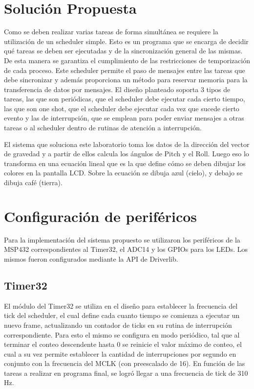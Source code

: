 \section{Solución Propuesta}

Como se deben realizar varias tareas de forma simultánea se requiere la
utilización de un scheduler simple. Esto es un programa que se encarga de
decidir qué tareas se deben ser ejecutadas y de la sincronización general de las
mismas. De esta manera se garantiza el cumplimiento de las restricciones de
temporización de cada proceso. Este scheduler permite el paso de mensajes entre
las tareas que debe sincronizar y además proporciona un método para reservar
memoria para la transferencia de datos por mensajes. El diseño planteado soporta
3 tipos de tareas, las que son periódicas, que el scheduler debe ejecutar cada
cierto tiempo, las que son one shot, que el scheduler debe ejecutar cada vez
que sucede cierto evento y las de interrupción, que se emplean para poder enviar
mensajes a otras tareas o al scheduler dentro de rutinas de atención a interrupción.

El sistema que soluciona este laboratorio toma los datos de la dirección del
vector de gravedad y a partir de ellos calcula los ángulos de Pitch y el Roll.
Luego eso lo transforma en una ecuación lineal que es la que define cómo se
deben dibujar los colores en la pantalla LCD. Sobre la ecuación se dibuja azul
(cielo), y debajo se dibuja café (tierra).

\section{Configuración de periféricos}
Para la implementación del sistema propuesto se utilizaron los periféricos de la
MSP432 correspondientes al Timer32, el ADC14 y los GPIOs para los LEDs. Los
mismos fueron configurados mediante la API de Driverlib.
\subsection{Timer32}
El módulo del Timer32 se utiliza en el diseño para establecer la frecuencia del
tick del scheduler, el cual define cada cuanto tiempo se comienza a ejecutar un
nuevo frame, actualizando un contador de ticks en su rutina de interrupción
correspondiente. Para esto el mismo se configura en modo periódico, tal que al
terminar el conteo descendente hasta 0 se reinicie el valor máximo de conteo, el
cual a su vez permite establecer la cantidad de interrupciones por segundo en
conjunto con la frecuencia del MCLK (con preescalado de 16). En función de las
tareas a realizar en programa final, se logró llegar a una frecuencia de tick de
310 Hz.

